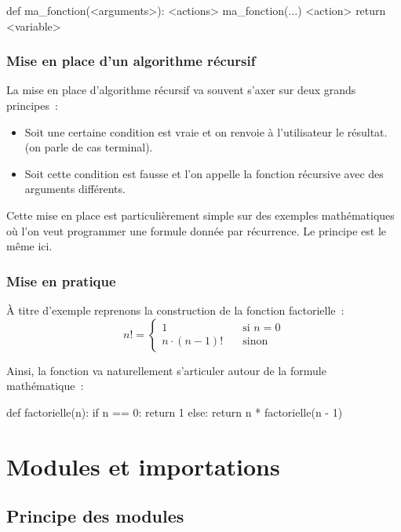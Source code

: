 		\begin{pythoncode}
			def ma_fonction(<arguments>):
				<actions>
				ma_fonction(...)
				<action>
				return <variable>
		\end{pythoncode}
		
		\subsubsection{Mise en place d'un algorithme récursif}
		La mise en place d'algorithme récursif va souvent s'axer sur deux grands principes~:
		\begin{itemize}
			\item Soit une certaine condition est vraie et on renvoie à l'utilisateur le résultat. (on parle de cas terminal).
			\item Soit cette condition est fausse et l'on appelle la fonction récursive avec des arguments différents.
		\end{itemize}
		
		Cette mise en place est particulièrement simple sur des exemples mathématiques où l'on veut programmer une formule donnée par récurrence. Le principe est le même ici. 
		
		\subsubsection{Mise en pratique}
		À titre d'exemple reprenons la construction de la fonction factorielle~:
		\[	n! = \left \{ \begin{array}{ll}
			1 & \quad \textrm{si $n = 0$} \\
			n \cdot (n - 1)! & \quad \textrm{sinon}
		\end{array} \right . \]
		
		Ainsi, la fonction va naturellement s'articuler autour de la formule mathématique~:
		\begin{pythoncode}
			def factorielle(n):
				if n == 0:
					return 1
				else:
					return n * factorielle(n - 1)
		\end{pythoncode}
		
\section{Modules et importations}
	
	\subsection{Principe des modules}
		
